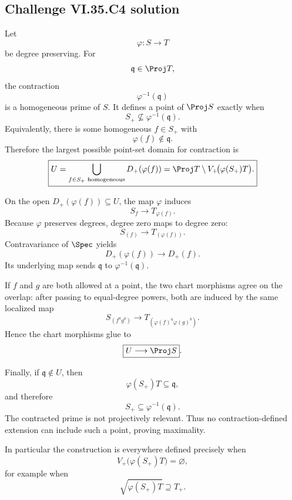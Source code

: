\subsection*{Challenge VI.35.C4 solution}
\begin{solution}
Let
\[
\varphi:S\to T
\]
be degree preserving.  For
\[
\mathfrak q\in\Proj T,
\]
the contraction
\[
\varphi^{-1}(\mathfrak q)
\]
is a homogeneous prime of \(S\).  It defines a point of \(\Proj S\) exactly when
\[
S_+\not\subseteq\varphi^{-1}(\mathfrak q).
\]
Equivalently, there is some homogeneous \(f\in S_+\) with
\[
\varphi(f)\notin\mathfrak q.
\]
Therefore the largest possible point-set domain for contraction is
\[
\boxed{
U
=
\bigcup_{f\in S_+\text{ homogeneous}}
D_+(\varphi(f))
=
\Proj T\setminus V_+\!\bigl(\varphi(S_+)T\bigr).
}
\]

On the open \(D_+(\varphi(f))\subseteq U\), the map \(\varphi\) induces
\[
S_f\longrightarrow T_{\varphi(f)}.
\]
Because \(\varphi\) preserves degrees, degree zero maps to degree zero:
\[
S_{(f)}
\longrightarrow
T_{(\varphi(f))}.
\]
Contravariance of \(\Spec\) yields
\[
D_+(\varphi(f))
\longrightarrow
D_+(f).
\]
Its underlying map sends \(\mathfrak q\) to \(\varphi^{-1}(\mathfrak q)\).

If \(f\) and \(g\) are both allowed at a point, the two chart morphisms agree on the overlap: after passing to
equal-degree powers, both are induced by the same localized map
\[
S_{(f^ag^b)}
\longrightarrow
T_{(\varphi(f)^a\varphi(g)^b)}.
\]
Hence the chart morphisms glue to
\[
\boxed{U\longrightarrow\Proj S}.
\]

Finally, if \(\mathfrak q\notin U\), then
\[
\varphi(S_+)T\subseteq\mathfrak q,
\]
and therefore
\[
S_+\subseteq\varphi^{-1}(\mathfrak q).
\]
The contracted prime is not projectively relevant.  Thus no contraction-defined extension can include such a
point, proving maximality.

In particular the construction is everywhere defined precisely when
\[
V_+\!\bigl(\varphi(S_+)T\bigr)=\varnothing,
\]
for example when
\[
\sqrt{\varphi(S_+)T}\supseteq T_+.
\]
\end{solution}


